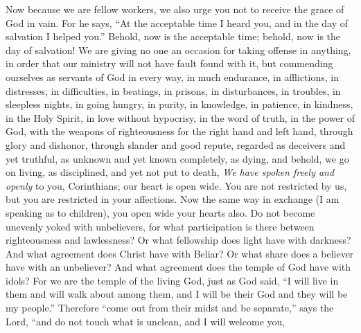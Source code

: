 \begin{biblechapter} %
 Now because we are fellow workers, we also urge you not to receive the grace of God in vain.
\verse For he says, “At the acceptable time I heard you, 
and in the day of salvation I helped you.”
\verse Behold, now is the acceptable time; behold, now is the day of salvation!
\verse We are giving no one an occasion for taking offense in anything, in order that our ministry will not have fault found with it,
\verse but commending ourselves as servants of God in every way, in much endurance, in afflictions, in distresses, in difficulties,
\verse in beatings, in prisons, in disturbances, in troubles, in sleepless nights, in going hungry,
\verse in purity, in knowledge, in patience, in kindness, in the Holy Spirit, in love without hypocrisy,
\verse in the word of truth, in the power of God, with the weapons of righteousness for the right hand and left hand,
\verse through glory and dishonor, through slander and good repute, regarded as deceivers and yet truthful,
\verse as unknown and yet known completely, as dying, and behold, we go on living, as disciplined, and yet not put to death,
\verse \textit{We have spoken freely and openly} to you, Corinthians; our heart is open wide.
\verse You are not restricted by us, but you are restricted in your affections.
\verse Now the same way in exchange (I am speaking as to children), you open wide your hearts also.
 Do not become unevenly yoked with unbelievers, for what participation is there between righteousness and lawlessness? Or what fellowship does light have with darkness?
\verse And what agreement does Christ have with Beliar? Or what share does a believer have with an unbeliever?
\verse And what agreement does the temple of God have with idols? For we are the temple of the living God, just as God said,
\verse “I will live in them and will walk about among them, 
and I will be their God and they will be my people.”
\verse Therefore “come out from their midst 
and be separate,” says the Lord, 
“and do not touch what is unclean, 
and I will welcome you,
\end{biblechapter}

